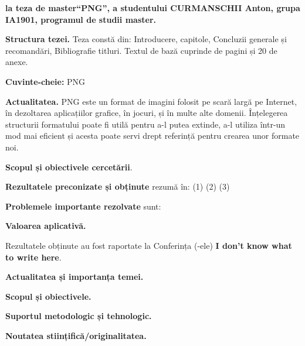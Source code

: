 \documentclass[a4paper,12pt]{report}
\newcommand{\authorName}{CURMANSCHII Anton}
\newcommand{\thesisTitle}{PNG}
\newcommand{\uniGroupName}{IA1901}
\newcommand{\thesisType}{master}
\newcommand{\programulDeStudii}{master}
\newcommand{\anexeCount}{20}
\newcommand{\conferencesList}{I don't know what to write here}
\begin{document}


\clearpage
\tableofcontents

\clearpage
{}
\begin{acronym}

\end{acronym}


\clearpage
{}

\textbf{la teza de \thesisType ``\thesisTitle'', a studentului \authorName{}, grupa \uniGroupName{}, programul de studii \programulDeStudii.}

\textbf{Structura tezei.}
Teza constă din: Introducere,  capitole, Concluzii generale și recomandări, Bibliografie \bibliographyEntryCount{} titluri.
Textul de bază cuprinde \usefulPageCount{} de pagini și \anexeCount{} de anexe.

\textbf{Cuvinte-cheie:} PNG

\textbf{Actualitatea.}
PNG este un format de imagini folosit pe scară largă pe Internet,
în dezoltarea aplicațiilor grafice, în jocuri, și în multe alte domenii.
Înțelegerea structurii formatului poate fi utilă pentru a-l putea extinde, 
a-l utiliza într-un mod mai eficient și acesta poate servi drept referință pentru 
crearea unor formate noi.

\textbf{Scopul și obiectivele cercetării}.



\textbf{Rezultatele preconizate și obținute} rezumă în: (1) (2) (3)

\textbf{Problemele importante rezolvate} sunt:

\textbf{Valoarea aplicativă.}

Rezultatele obținute au fost raportate la Conferința (-ele) \textbf{\conferencesList}.



\textbf{Actualitatea și importanța temei.}

\textbf{Scopul și obiectivele.}

\textbf{Suportul metodologic și tehnologic.}

\textbf{Noutatea stiințifică/originalitatea.}
\end{document}
